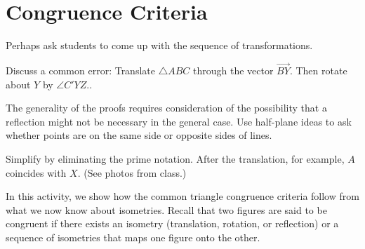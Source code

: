 \newpage

\section{Congruence Criteria}
\begin{teachingnote}
Perhaps ask students to come up with the sequence of transformations. 

Discuss a common error:   Translate $\triangle ABC$ through the vector $\overrightarrow{BY}$.  Then rotate about $Y$ by $\angle C'YZ.$. 

The generality of the proofs requires consideration of the possibility that a reflection might not be necessary in the general case.  Use half-plane ideas to ask whether points are on the same side or opposite sides of lines.  

Simplify by eliminating the prime notation.  After the translation, for example, $A$ coincides with $X$.  (See photos from class.)
\end{teachingnote}

In this activity, we show how the common triangle congruence criteria follow from
 what we now know about isometries.  Recall that two figures are said to be 
congruent if there exists an isometry (translation, rotation, or reflection) or a 
sequence of isometries that maps one figure onto the other.  

